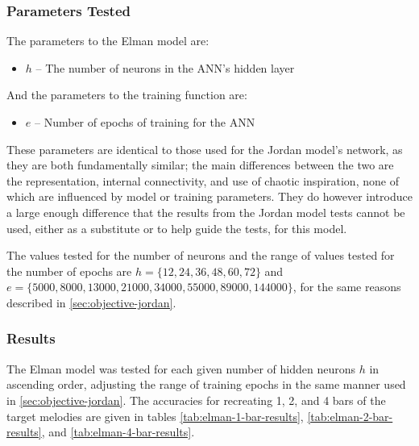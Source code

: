 \documentclass[ author={Stephen Livermore-Tozer},
				supervisor={Dr. Peter Flach},
				degree={MEng},
				title={Algorithmic Co-composition Using Machine Learning},
				subtitle={},
				type={research},
				year={2016} ]{dissertation}
\begin{document}
	\subsubsection{Parameters Tested}
	
	The parameters to the Elman model are:
	\begin{itemize}
		\item $h$ -- The number of neurons in the ANN's hidden layer
	\end{itemize}
	And the parameters to the training function are:
	\begin{itemize}
		\item $e$ -- Number of epochs of training for the ANN
	\end{itemize}
	
	These parameters are identical to those used for the Jordan model's network, as they are both fundamentally similar; the main differences between the two are the representation, internal connectivity, and use of chaotic inspiration, none of which are influenced by model or training parameters. They do however introduce a large enough difference that the results from the Jordan model tests cannot be used, either as a substitute or to help guide the tests, for this model.
	
	The values tested for the number of neurons and the range of values tested for the number of epochs are $h = \{12, 24, 36, 48, 60, 72\}$ and $e = \{5000, 8000, 13000, 21000, 34000, 55000, 89000, 144000\}$, for the same reasons described in \ref{sec:objective-jordan}.
	
	\subsubsection{Results}
	
	The Elman model was tested for each given number of hidden neurons $h$ in ascending order, adjusting the range of training epochs in the same manner used in \ref{sec:objective-jordan}. The accuracies for recreating 1, 2, and 4 bars of the target melodies are given in tables \ref{tab:elman-1-bar-results}, \ref{tab:elman-2-bar-results}, and \ref{tab:elman-4-bar-results}.
	
\end{document}
